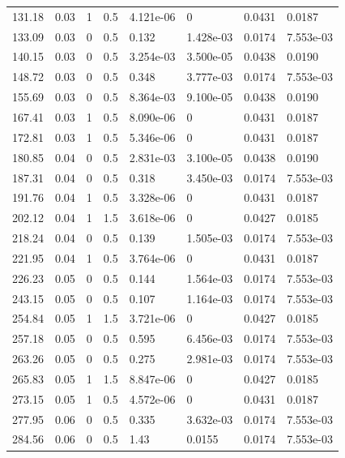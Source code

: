 \documentclass[preview]{standalone}
\begin{document}
{{\begin{tabular}{L{1.2cm}C{1.2cm} C{0.3cm}C{0.5cm} C{1.4cm}C{1.4cm} C{1.4cm}C{1.4cm}}
  131.18  &  0.03  & 1     & 0.5 &  4.121e-06  & 0  & 0.0431 &  0.0187   \\ 
  133.09  &  0.03  & 0     & 0.5 &  0.132  & 1.428e-03  & 0.0174 &  7.553e-03   \\ 
  140.15  &  0.03  & 0     & 0.5 &  3.254e-03  & 3.500e-05  & 0.0438 &  0.0190   \\ 
  148.72  &  0.03  & 0     & 0.5 &  0.348  & 3.777e-03  & 0.0174 &  7.553e-03   \\ 
  155.69  &  0.03  & 0     & 0.5 &  8.364e-03  & 9.100e-05  & 0.0438 &  0.0190   \\ 
  167.41  &  0.03  & 1     & 0.5 &  8.090e-06  & 0  & 0.0431 &  0.0187   \\ 
  172.81  &  0.03  & 1     & 0.5 &  5.346e-06  & 0  & 0.0431 &  0.0187   \\ 
  180.85  &  0.04  & 0     & 0.5 &  2.831e-03  & 3.100e-05  & 0.0438 &  0.0190   \\ 
  187.31  &  0.04  & 0     & 0.5 &  0.318  & 3.450e-03  & 0.0174 &  7.553e-03   \\ 
  191.76  &  0.04  & 1     & 0.5 &  3.328e-06  & 0  & 0.0431 &  0.0187   \\ 
  202.12  &  0.04  & 1     & 1.5 &  3.618e-06  & 0  & 0.0427 &  0.0185   \\ 
  218.24  &  0.04  & 0     & 0.5 &  0.139  & 1.505e-03  & 0.0174 &  7.553e-03   \\ 
  221.95  &  0.04  & 1     & 0.5 &  3.764e-06  & 0  & 0.0431 &  0.0187   \\ 
  226.23  &  0.05  & 0     & 0.5 &  0.144  & 1.564e-03  & 0.0174 &  7.553e-03   \\ 
  243.15  &  0.05  & 0     & 0.5 &  0.107  & 1.164e-03  & 0.0174 &  7.553e-03   \\ 
  254.84  &  0.05  & 1     & 1.5 &  3.721e-06  & 0  & 0.0427 &  0.0185   \\ 
  257.18  &  0.05  & 0     & 0.5 &  0.595  & 6.456e-03  & 0.0174 &  7.553e-03   \\ 
  263.26  &  0.05  & 0     & 0.5 &  0.275  & 2.981e-03  & 0.0174 &  7.553e-03   \\ 
  265.83  &  0.05  & 1     & 1.5 &  8.847e-06  & 0  & 0.0427 &  0.0185   \\ 
  273.15  &  0.05  & 1     & 0.5 &  4.572e-06  & 0  & 0.0431 &  0.0187   \\ 
  277.95  &  0.06  & 0     & 0.5 &  0.335  & 3.632e-03  & 0.0174 &  7.553e-03   \\ 
  284.56  &  0.06  & 0     & 0.5 &  1.43  & 0.0155  & 0.0174 &  7.553e-03   \\ 

\end{tabular}}}
\end{document}
